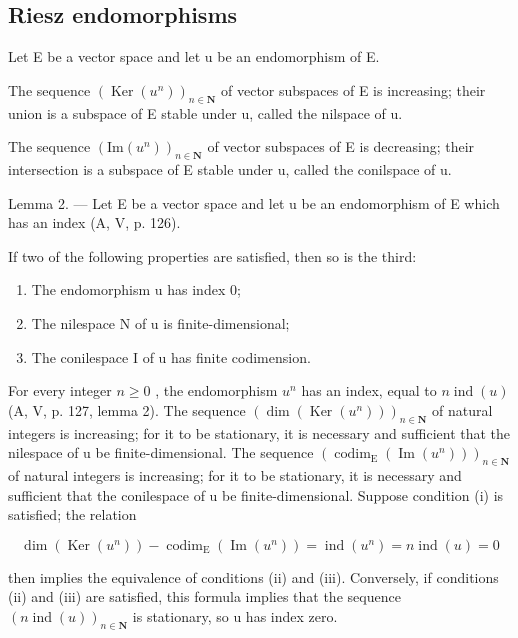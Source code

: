 \subsection{Riesz endomorphisms}

Let E be a vector space and let u be an endomorphism of E.

The sequence \((\operatorname{Ker}(u^{n}))_{n\in\mathbf{N}}\) of vector subspaces of E is increasing; their union is a subspace of E stable under u, called the nilspace of u.

The sequence \((\mathrm{Im}(u^{n}))_{n\in\mathbf{N}}\) of vector subspaces of E is decreasing; their intersection is a subspace of E stable under u, called the conilspace of u.

Lemma 2. --- Let E be a vector space and let u be an endomorphism of E which has an index (A, V, p. 126).

If two of the following properties are satisfied, then so is the third:

\begin{enumerate}
\def\labelenumi{(\roman{enumi})}
\item
  The endomorphism u has index 0;
\item
  The nilespace N of u is finite-dimensional;
\item
  The conilespace I of u has finite codimension.
\end{enumerate}

For every integer \(n \geqslant 0\) , the endomorphism \(u^{n}\) has an index, equal to \(n \operatorname{ind}(u)\) (A, V, p. 127, lemma 2). The sequence \((\dim(\operatorname{Ker}(u^{n})))_{n \in \mathbf{N}}\) of natural integers is increasing; for it to be stationary, it is necessary and sufficient that the nilespace of u be finite-dimensional. The sequence \((\operatorname{codim}_{\operatorname{E}}(\operatorname{Im}(u^{n})))_{n \in \mathbf{N}}\) of natural integers is increasing; for it to be stationary, it is necessary and sufficient that the conilespace of u be finite-dimensional. Suppose condition (i) is satisfied; the relation

\[
\dim (\operatorname{Ker} (u ^ {n})) - \operatorname{codim} _ {\mathrm{E}} (\operatorname{Im} (u ^ {n})) = \operatorname{ind} (u ^ {n}) = n \operatorname{ind} (u) = 0
\]

then implies the equivalence of conditions (ii) and (iii). Conversely, if conditions (ii) and (iii) are satisfied, this formula implies that the sequence \((n\operatorname{ind}(u))_{n\in\mathbf{N}}\) is stationary, so u has index zero.

